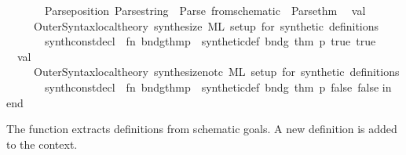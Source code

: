 \begin{isabellebody}
\ \ \ \ \ \ \ Parse{\isachardot}{\kern0pt}position\ {\isacharparenleft}{\kern0pt}Parse{\isachardot}{\kern0pt}string\ {\isacharminus}{\kern0pt}{\isacharminus}{\kern0pt}\ {\isacharparenleft}{\kern0pt}{\isacharparenleft}{\kern0pt}Parse{\isachardot}{\kern0pt}{\isachardollar}{\kern0pt}{\isachardollar}{\kern0pt}{\isachardollar}{\kern0pt}\ {\isachardoublequote}{\kern0pt}from{\isacharunderscore}{\kern0pt}schematic{\isachardoublequote}{\kern0pt}\ {\isacharbar}{\kern0pt}{\isacharminus}{\kern0pt}{\isacharminus}{\kern0pt}\ Parse{\isachardot}{\kern0pt}thm{\isacharparenright}{\kern0pt}{\isacharparenright}{\kern0pt}{\isacharparenright}{\kern0pt}{\isacharsemicolon}{\kern0pt}\isanewline
\isanewline
\ \ val\ {\isacharunderscore}{\kern0pt}\ {\isacharequal}{\kern0pt}\isanewline
\ \ \ \ \ Outer{\isacharunderscore}{\kern0pt}Syntax{\isachardot}{\kern0pt}local{\isacharunderscore}{\kern0pt}theory\ \isactrlcommandUNDERSCOREkeyword {\isasymopen}synthesize{\isasymclose}\ {\isachardoublequote}{\kern0pt}ML\ setup\ for\ synthetic\ definitions{\isachardoublequote}{\kern0pt}\isanewline
\ \ \ \ \ \ \ {\isacharparenleft}{\kern0pt}synth{\isacharunderscore}{\kern0pt}constdecl\ {\isachargreater}{\kern0pt}{\isachargreater}{\kern0pt}\ {\isacharparenleft}{\kern0pt}fn\ {\isacharparenleft}{\kern0pt}{\isacharparenleft}{\kern0pt}bndg{\isacharcomma}{\kern0pt}thm{\isacharparenright}{\kern0pt}{\isacharcomma}{\kern0pt}p{\isacharparenright}{\kern0pt}\ {\isacharequal}{\kern0pt}{\isachargreater}{\kern0pt}\ synthetic{\isacharunderscore}{\kern0pt}def\ bndg\ thm\ p\ true\ true{\isacharparenright}{\kern0pt}{\isacharparenright}{\kern0pt}\isanewline
\isanewline
\ \ val\ {\isacharunderscore}{\kern0pt}\ {\isacharequal}{\kern0pt}\isanewline
\ \ \ \ \ Outer{\isacharunderscore}{\kern0pt}Syntax{\isachardot}{\kern0pt}local{\isacharunderscore}{\kern0pt}theory\ \isactrlcommandUNDERSCOREkeyword {\isasymopen}synthesize{\isacharunderscore}{\kern0pt}notc{\isasymclose}\ {\isachardoublequote}{\kern0pt}ML\ setup\ for\ synthetic\ definitions{\isachardoublequote}{\kern0pt}\isanewline
\ \ \ \ \ \ \ {\isacharparenleft}{\kern0pt}synth{\isacharunderscore}{\kern0pt}constdecl\ {\isachargreater}{\kern0pt}{\isachargreater}{\kern0pt}\ {\isacharparenleft}{\kern0pt}fn\ {\isacharparenleft}{\kern0pt}{\isacharparenleft}{\kern0pt}bndg{\isacharcomma}{\kern0pt}thm{\isacharparenright}{\kern0pt}{\isacharcomma}{\kern0pt}p{\isacharparenright}{\kern0pt}\ {\isacharequal}{\kern0pt}{\isachargreater}{\kern0pt}\ synthetic{\isacharunderscore}{\kern0pt}def\ bndg\ thm\ p\ false\ false{\isacharparenright}{\kern0pt}{\isacharparenright}{\kern0pt}\isanewline
\isanewline
in\isanewline
\isanewline
end\isanewline
{\isacartoucheclose}%
\endisatagML
{\isafoldML}%
%
\isadelimML
%
\endisadelimML
%
\begin{isamarkuptext}%
The  function extracts definitions from
schematic goals. A new definition is added to the context.%
\end{isamarkuptext}\isamarkuptrue%
%
\isadelimtheory
%
\endisadelimtheory
%
\isatagtheory
{}\isamarkupfalse%
%
\endisatagtheory
{\isafoldtheory}%
%
\isadelimtheory
%
\endisadelimtheory
%
\end{isabellebody}%
